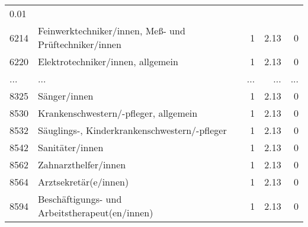 \begin{longtable}{lXrrr}
          \num[round-mode=places,round-precision=2]{0,01} \\
        6214 & \multicolumn{1}{X}{Feinwerktechniker/innen, Meß- und Prüftechniker/innen} & %
          \num{1} &
          \num[round-mode=places,round-precision=2]{2,13} &
          \num[round-mode=places,round-precision=2]{0} \\
        6220 & \multicolumn{1}{X}{Elektrotechniker/innen, allgemein} & %
          \num{1} &
          \num[round-mode=places,round-precision=2]{2,13} &
          \num[round-mode=places,round-precision=2]{0} \\
       ... & ... & ... & ... & ... \\
        8325 & \multicolumn{1}{X}{Sänger/innen} & %
          \num{1} &
          \num[round-mode=places,round-precision=2]{2,13} &
          \num[round-mode=places,round-precision=2]{0} \\

        8530 & \multicolumn{1}{X}{Krankenschwestern/-pfleger, allgemein} & %
          \num{1} &
          \num[round-mode=places,round-precision=2]{2,13} &
          \num[round-mode=places,round-precision=2]{0} \\

        8532 & \multicolumn{1}{X}{Säuglings-, Kinderkrankenschwestern/-pfleger} & %
          \num{1} &
          \num[round-mode=places,round-precision=2]{2,13} &
          \num[round-mode=places,round-precision=2]{0} \\

        8542 & \multicolumn{1}{X}{Sanitäter/innen} & %
          \num{1} &
          \num[round-mode=places,round-precision=2]{2,13} &
          \num[round-mode=places,round-precision=2]{0} \\

        8562 & \multicolumn{1}{X}{Zahnarzthelfer/innen} & %
          \num{1} &
          \num[round-mode=places,round-precision=2]{2,13} &
          \num[round-mode=places,round-precision=2]{0} \\

        8564 & \multicolumn{1}{X}{Arztsekretär(e/innen)} & %
          \num{1} &
          \num[round-mode=places,round-precision=2]{2,13} &
          \num[round-mode=places,round-precision=2]{0} \\

        8594 & \multicolumn{1}{X}{Beschäftigungs- und Arbeitstherapeut(en/innen)} & %
          \num{1} &
          \num[round-mode=places,round-precision=2]{2,13} &
          \num[round-mode=places,round-precision=2]{0} \\


\end{longtable}
